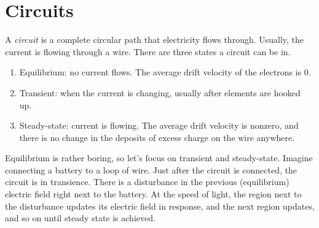 \documentclass[nobib]{tufte-handout}
\begin{document}
\section{Circuits}
A \emph{circuit} is a complete circular path that electricity flows through.
Usually, the current is flowing through a wire. There are three states a circuit 
can be in. 
\begin{enumerate}
    \item Equilibrium: no current flows. The average drift velocity of the electrons is 0. 
    \item Transient: when the current is changing, usually after elements are hooked up. 
    \item Steady-state: current is flowing. The average drift velocity is nonzero, 
    and there is no change in the deposits of excess charge on the wire anywhere.
\end{enumerate} 
Equilibrium is rather boring, so let's focus on transient and steady-state. Imagine connecting 
a battery to a loop of wire. Just after the circuit is connected, the circuit is in transience.
There is a disturbance in the previous (equilibrium) electric field right next to the battery. 
At the speed of light, the region next to the disturbance updates its electric field in response, 
and the next region updates, and so on until steady state is achieved.
\end{document}
